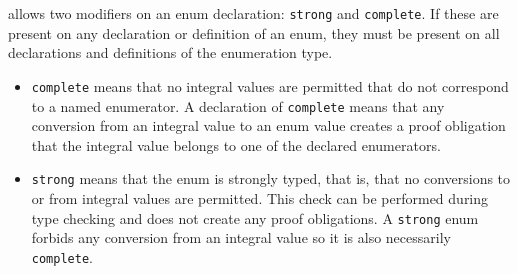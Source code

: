 \NAME{} allows two modifiers on an enum declaration: \lstinline|strong| and \lstinline|complete|. If these are present on any declaration or definition of an enum, they must be present on all declarations and definitions of the enumeration type.
\begin{itemize}
	\item \lstinline|complete| means that no integral values are permitted that do not correspond to a named enumerator. A declaration of \lstinline|complete| means that any conversion from an integral value to an enum value 
	creates a proof obligation that the integral value belongs to one of the declared enumerators.
	\item \lstinline|strong| means that the enum is strongly
	typed, that is, that no conversions to or from integral
	values are permitted. This check can be performed during
	type checking and does not create any proof obligations.
	A \lstinline|strong| enum forbids any conversion from an integral value
	so it is also necessarily \lstinline|complete|.
\end{itemize}
